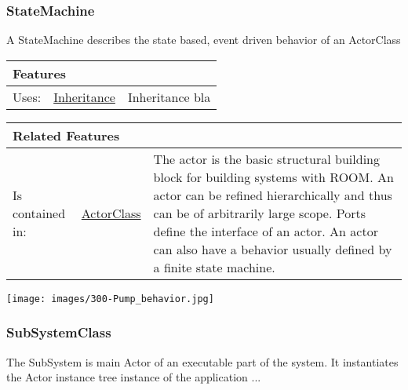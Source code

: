 			
		
		\subsubsection{StateMachine}
			\hypertarget{ref:StateMachine}{}
			
			A StateMachine describes the state based, event driven behavior of an ActorClass
			
			
			\vspace{\baselineskip}
			\begingroup
			\renewcommand{\arraystretch}{1.8} %
			\parbox{\textwidth}{
			\begin{longtable}{l l p{}}
				\multicolumn{2}{l}{\textbf{\large Features}} & \\
				\hline
			Uses: & \tabitem \hyperlink{ref:Inheritance}{Inheritance}  & Inheritance bla\\
			\hline
			\end{longtable}	
			}
			\endgroup
			\vspace{\baselineskip}
			
			\vspace{\baselineskip}
			\begingroup
			\renewcommand{\arraystretch}{1.8} %
			\parbox{\textwidth}{
			\begin{longtable}{l l p{}}
				\multicolumn{2}{l}{\textbf{\large Related Features}} & \\
				\hline
			Is contained in: & \tabitem \hyperlink{ref:ActorClass}{ActorClass}  & The actor is the basic structural building block for building systems with ROOM. An actor can be refined hierarchically and thus can be of arbitrarily large scope. Ports define the interface of an actor. An actor can also have a behavior usually defined by a finite state machine. \\
			\hline
			\end{longtable}	
			}
			\endgroup
			\vspace{\baselineskip}
			
			
			\texttt{[image: images/300-Pump\_behavior.jpg]}
		
		\subsubsection{SubSystemClass}
			\hypertarget{ref:SubSystemClass}{}
			
			The SubSystem is main Actor of an executable part of the system. It instantiates the Actor instance tree instance of the application ...
				
